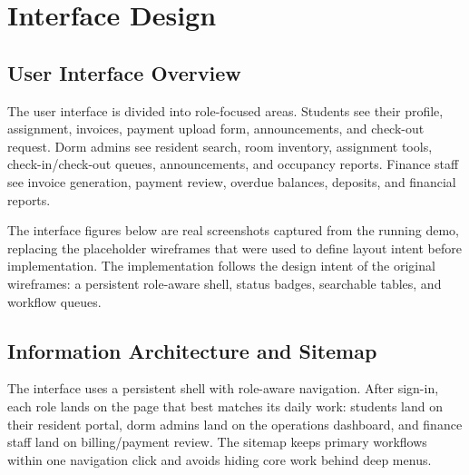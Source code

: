 \documentclass[11pt,a4paper]{article}
\begin{document}
\section{Interface Design}

\subsection{User Interface Overview}
The user interface is divided into role-focused areas. Students see their profile, assignment, invoices, payment upload form, announcements, and check-out request. Dorm admins see resident search, room inventory, assignment tools, check-in/check-out queues, announcements, and occupancy reports. Finance staff see invoice generation, payment review, overdue balances, deposits, and financial reports.

The interface figures below are real screenshots captured from the running demo, replacing the placeholder wireframes that were used to define layout intent before implementation. The implementation follows the design intent of the original wireframes: a persistent role-aware shell, status badges, searchable tables, and workflow queues.

\subsection{Information Architecture and Sitemap}
The interface uses a persistent shell with role-aware navigation. After sign-in, each role lands on the page that best matches its daily work: students land on their resident portal, dorm admins land on the operations dashboard, and finance staff land on billing/payment review. The sitemap keeps primary workflows within one navigation click and avoids hiding core work behind deep menus.
\end{document}
